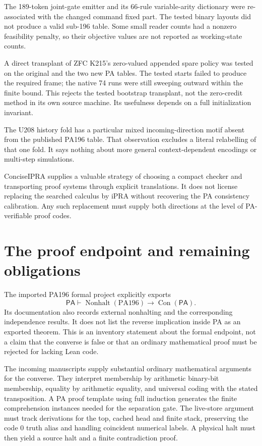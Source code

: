 \documentclass[11pt,a4paper]{article}
\newcommand{\PA}{\mathsf{PA}}
\newcommand{\Con}{\operatorname{Con}}
\newcommand{\Nonhalt}{\operatorname{Nonhalt}}
\begin{document}
The 189-token joint-gate emitter and its 66-rule variable-arity dictionary
were re-associated with the changed command fixed part. The tested
binary layouts did not produce a valid sub-196 table. Some small
reader counts had a nonzero feasibility penalty, so their objective
values are not reported as working-state counts.

A direct transplant of ZFC K215's zero-valued appended spare policy was
tested on the original and the two new PA tables. The tested starts
failed to produce the required frame; the native 74 runs were still
sweeping outward within the finite bound. This rejects the tested
bootstrap transplant, not the zero-credit method in its own source
machine. Its usefulness depends on a full initialization invariant.

The U208 history fold has a particular mixed incoming-direction motif
absent from the published PA196 table. That observation excludes a
literal relabelling of that one fold. It says nothing about more general
context-dependent encodings or multi-step simulations.

ConciseIPRA supplies a valuable strategy of choosing a compact checker
and transporting proof systems through explicit translations. It does
not license replacing the searched calculus by iPRA without recovering
the PA consistency calibration. Any such replacement must supply both
directions at the level of PA-verifiable proof codes.



\section{The proof endpoint and remaining obligations}
\label{sec:endpoint}

The imported PA196 formal project explicitly exports
\[
                 \PA\vdash\Nonhalt(\mathrm{PA196})\to\Con(\PA).
\]
Its documentation also records external nonhalting and the corresponding
independence results. It does not list the reverse implication inside
PA as an exported theorem. This is an inventory statement about the
formal endpoint, not a claim that the converse is false or that an
ordinary mathematical proof must be rejected for lacking Lean code.

The incoming manuscripts supply substantial ordinary mathematical
arguments for the converse. They interpret membership by arithmetic
binary-bit membership, equality by arithmetic equality, and universal
coding with the stated transposition. A PA proof template using full
induction generates the finite comprehension instances needed for the
separation gate. The live-store argument must track derivations for
the top, cached head and finite stack, preserving the code 0 truth alias
and handling coincident numerical labels. A physical halt must then
yield a source halt and a finite contradiction proof.
\end{document}
